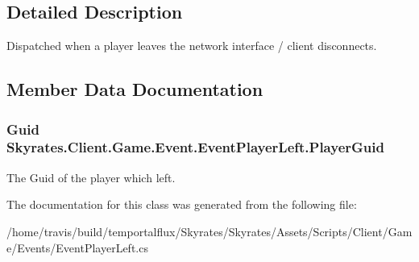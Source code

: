 \subsection{Detailed Description}
Dispatched when a player leaves the network interface / client disconnects. 



\subsection{Member Data Documentation}
\hypertarget{class_skyrates_1_1_client_1_1_game_1_1_event_1_1_event_player_left_acf2e0404fa31a728d52f9fd12fec8bd3}{
\subsubsection[{Player\-Guid}]{\setlength{\rightskip}{0pt plus 5cm}Guid Skyrates.\-Client.\-Game.\-Event.\-Event\-Player\-Left.\-Player\-Guid}}\label{class_skyrates_1_1_client_1_1_game_1_1_event_1_1_event_player_left_acf2e0404fa31a728d52f9fd12fec8bd3}


The Guid of the player which left. 



The documentation for this class was generated from the following file\-:\begin{DoxyCompactItemize}
\item 
/home/travis/build/temportalflux/\-Skyrates/\-Skyrates/\-Assets/\-Scripts/\-Client/\-Game/\-Events/Event\-Player\-Left.\-cs\end{DoxyCompactItemize}
